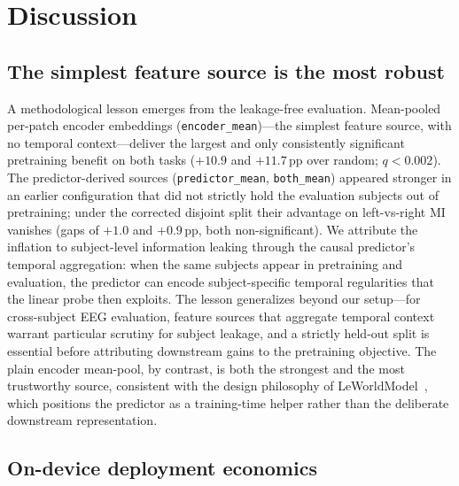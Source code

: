 \section{Discussion}
\label{sec:discussion}

\subsection{The simplest feature source is the most robust}
\label{sec:disc:predictor}

A methodological lesson emerges from the leakage-free evaluation.
Mean-pooled per-patch encoder embeddings (\texttt{encoder\_mean})---the
simplest feature source, with no temporal context---deliver the largest and
only consistently significant pretraining benefit on both tasks
($+10.9$ and $+11.7$\,pp over random; $q<0.002$). The predictor-derived
sources (\texttt{predictor\_mean}, \texttt{both\_mean}) appeared stronger in
an earlier configuration that did not strictly hold the evaluation subjects
out of pretraining; under the corrected disjoint split their advantage on
left-vs-right MI vanishes (gaps of $+1.0$ and $+0.9$\,pp, both
non-significant). We attribute the inflation to subject-level information
leaking through the causal predictor's temporal aggregation: when the same
subjects appear in pretraining and evaluation, the predictor can encode
subject-specific temporal regularities that the linear probe then exploits.
The lesson generalizes beyond our setup---for cross-subject EEG evaluation,
feature sources that aggregate temporal context warrant particular scrutiny
for subject leakage, and a strictly held-out split is essential before
attributing downstream gains to the pretraining objective. The plain encoder
mean-pool, by contrast, is both the strongest and the most trustworthy
source, consistent with the design philosophy of
LeWorldModel~\cite{lewm2026}, which positions the predictor as a
training-time helper rather than the deliberate downstream representation.

\subsection{On-device deployment economics}

